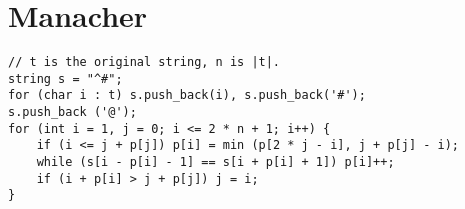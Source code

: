 \section{Manacher}

\begin{verbatim}
// t is the original string, n is |t|.
string s = "^#";
for (char i : t) s.push_back(i), s.push_back('#');
s.push_back ('@');
for (int i = 1, j = 0; i <= 2 * n + 1; i++) {
    if (i <= j + p[j]) p[i] = min (p[2 * j - i], j + p[j] - i);
    while (s[i - p[i] - 1] == s[i + p[i] + 1]) p[i]++;
    if (i + p[i] > j + p[j]) j = i;
}
\end{verbatim}